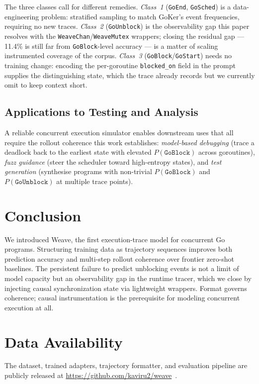 \documentclass[10pt,conference]{IEEEtran}
\newcommand{\eblock}{\texttt{GoBlock}}
\newcommand{\eunblock}{\texttt{GoUnblock}}
\newcommand{\estart}{\texttt{GoStart}}
\newcommand{\eend}{\texttt{GoEnd}}
\newcommand{\esched}{\texttt{GoSched}}
\begin{document}
The three classes call for different remedies. \textit{Class~1}
(\eend, \esched) is a data-engineering problem: stratified sampling to
match GoKer's event frequencies, requiring no new traces.
\textit{Class~2} (\eunblock) is the observability gap this paper
resolves with the \texttt{WeaveChan}/\texttt{WeaveMutex} wrappers;
closing the residual gap — 11.4\% is still far from \eblock-level
accuracy — is a matter of scaling instrumented coverage of the corpus.
\textit{Class~3} (\eblock/\estart) needs no training change: encoding
the per-goroutine \texttt{blocked\_on} field in the prompt supplies the
distinguishing state, which the trace already records but we currently
omit to keep context short.

\subsection{Applications to Testing and Analysis}

A reliable concurrent execution simulator enables downstream uses that
all require the rollout coherence this work establishes: \textit{model-based
debugging} (trace a deadlock back to the earliest state with elevated
$P(\eblock)$ across goroutines), \textit{fuzz guidance} (steer the
scheduler toward high-entropy states), and \textit{test generation}
(synthesise programs with non-trivial $P(\eblock)$ and $P(\eunblock)$
at multiple trace points).

\section{Conclusion}\label{sec:conclusion}

We introduced Weave, the first execution-trace model for concurrent Go programs. Structuring training data as trajectory sequences improves both prediction accuracy and multi-step rollout coherence over frontier zero-shot baselines. The persistent failure to predict unblocking events is not a limit of model capacity but an observability gap in the runtime tracer, which we close by injecting causal synchronization state via lightweight wrappers. Format governs coherence; causal instrumentation is the prerequisite for modeling concurrent execution at all.

\section*{Data Availability}
The dataset, trained adapters, trajectory formatter, and evaluation
pipeline are publicly released at \url{https://github.com/kaviru2/weave}~\cite{anon-artifacts}.



\end{document}
